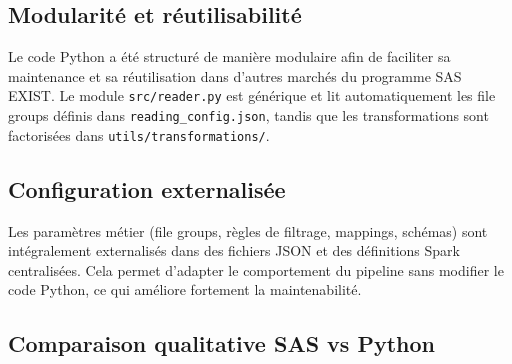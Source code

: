 \subsection{Modularité et réutilisabilité}

Le code Python a été structuré de manière modulaire afin de faciliter sa maintenance
et sa réutilisation dans d’autres marchés du programme SAS EXIST. Le module
\texttt{src/reader.py} est générique et lit automatiquement les file groups définis
dans \texttt{reading\_config.json}, tandis que les transformations sont
factorisées dans \texttt{utils/transformations/}.

\subsection{Configuration externalisée}

Les paramètres métier (file groups, règles de filtrage, mappings, schémas) sont
intégralement externalisés dans des fichiers JSON et des définitions Spark
centralisées. Cela permet d’adapter le comportement du pipeline sans modifier le
code Python, ce qui améliore fortement la maintenabilité.

\subsection{Comparaison qualitative SAS vs Python}

